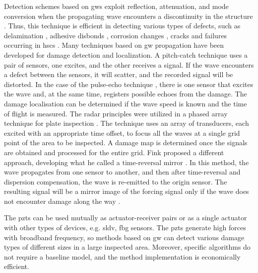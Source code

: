 Detection schemes based on \acp{gw} exploit reflection, attenuation, and mode conversion when the propagating wave encounters a discontinuity in the structure \cite{alleyne1992interaction}.
Thus, this technique is efficient in detecting various types of defects, such as delamination \cite{sohn2011delamination,tian2015delamination}, adhesive disbonds \cite{rucka2018damage,balasubramaniam2021ultrasonic}, corrosion changes \cite{alleyne1995long,lowe1998defect}, cracks \cite{tua2004detection,lu2006crack,zima2020detection} and failures occurring in \acp{hsc} \cite{mustapha2011assessment, sikdar2016guided, sikdar2016ultrasonic,radzienski2016assessment, yu2019core}.
Many techniques based on \ac{gw} propagation have been developed for damage detection and localization.
A pitch-catch technique \cite{ihn2008pitch, sikdar2017structural} uses a pair of sensors, one excites, and the other receives a signal.
If the wave encounters a defect between the sensors, it will scatter, and the recorded signal will be distorted.
In the case of the pulse-echo technique \cite{guo1993interaction, kudela2008damage}, there is one sensor that excites the wave and, at the same time, registers possible echoes from the damage.
The damage localisation can be determined if the wave speed is known and the time of flight is measured.
The radar principles were utilized in a phased array technique for plate inspection \cite{giurgiutiu2004embedded, ostachowicz2008elastic, kudela2018structural}.
The technique uses an array of transducers, each excited with an appropriate time offset, to focus all the waves at a single grid point of the area to be inspected.
A damage map is determined once the signals are obtained and processed for the entire grid.
Fink proposed a different approach, developing what he called a time-reversal mirror \cite{fink1992time}.
In this method, the wave propagates from one sensor to another, and then after time-reversal and dispersion compensation, the wave is re-emitted to the origin sensor.
The resulting signal will be a mirror image of the forcing signal only if the wave does not encounter damage along the way \cite{park2007time, eremin2016analytically}.

The \acp{pzt} can be used mutually as actuator-receiver pairs or as a single actuator with other types of devices, e.g. \ac{sldv}, \ac{fbg} sensors.
The \acp{pzt} generate high forces with broadband frequency, so methods based on \ac{gw} can detect various damage types of different sizes in a large inspected area.
Moreover, specific algorithms do not require a baseline model, and the method implementation is economically efficient.

